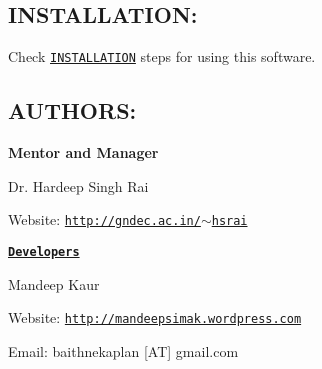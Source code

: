 \subsection*{I\-N\-S\-T\-A\-L\-L\-A\-T\-I\-O\-N\-:}

Check \href{https://github.com/GreatDevelopers/bakaplan/blob/master/INSTALLATION.txt}{\tt I\-N\-S\-T\-A\-L\-L\-A\-T\-I\-O\-N} steps for using this software.

\subsection*{A\-U\-T\-H\-O\-R\-S\-:}

{\bfseries Mentor and Manager}

Dr. Hardeep Singh Rai

Website\-: \href{http://gndec.ac.in/~hsrai}{\tt http\-://gndec.\-ac.\-in/$\sim$hsrai}

{\bfseries \href{https://github.com/GreatDevelopers/bakaplan/wiki/Contributors}{\tt Developers}}

Mandeep Kaur

Website\-: \href{http://mandeepsimak.wordpress.com}{\tt http\-://mandeepsimak.\-wordpress.\-com}

Email\-: baithnekaplan \mbox{[}A\-T\mbox{]} gmail.\-com 